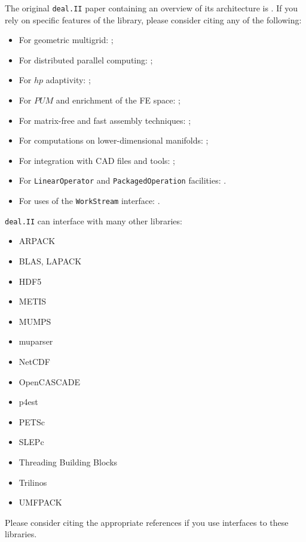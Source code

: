 \documentclass{ansarticle-preprint}
\newcommand{\specialword}[1]{\texttt{#1}}
\newcommand{\dealii}{{\specialword{deal.II}}}
\begin{document}
The original \texttt{\dealii{}} paper containing an overview of its
architecture is \cite{BangerthHartmannKanschat2007}. If you rely on specific
features of the library, please consider citing any of the following:
\begin{itemize}
 \item For geometric multigrid: \cite{Kanschat2004,JanssenKanschat2011};
 \item For distributed parallel computing: \cite{BangerthBursteddeHeisterKronbichler11};
 \item For $hp$ adaptivity: \cite{BangerthKayserHerold2007};
  \item For $PUM$ and enrichment of the FE space: \cite{Davydov2016};
 \item For matrix-free and fast assembly techniques:
   \cite{KronbichlerKormann2012};
 \item For computations on lower-dimensional manifolds:
   \cite{DeSimoneHeltaiManigrasso2009};
 \item For integration with CAD files and tools:
   \cite{HeltaiMola2015};
 \item For \texttt{LinearOperator} and \texttt{PackagedOperation} facilities:
   \cite{MaierBardelloniHeltai-2016-a,MaierBardelloniHeltai-2016-b}.
 \item For uses of the \texttt{WorkStream} interface:
   \cite{TKB16}.
\end{itemize}

\dealii{} can interface with many other libraries:
\begin{multicols}{2}
\begin{itemize}
\item ARPACK \cite{arpack}
\item BLAS, LAPACK
\item HDF5 \cite{hdf5}
\item METIS \cite{karypis1998fast}
\item MUMPS \cite{ADE00,MUMPS:1,MUMPS:2,mumps-web-page}
\item muparser \cite{muparser-web-page}
\item NetCDF \cite{rew1990netcdf}
\item OpenCASCADE \cite{opencascade-web-page}
\item p4est \cite{p4est}
\item PETSc \cite{petsc-user-ref,petsc-web-page}
\item SLEPc \cite{Hernandez:2005:SSF}
\item Threading Building Blocks \cite{Rei07}
\item Trilinos \cite{trilinos,trilinos-web-page}
\item UMFPACK \cite{umfpack}
\end{itemize}
\end{multicols}
Please consider citing the appropriate references if you use interfaces to these
libraries.
\end{document}
